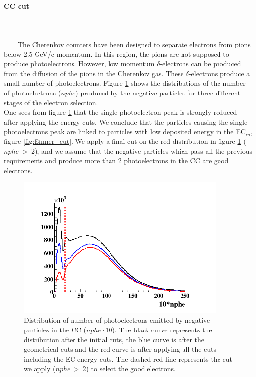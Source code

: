\begin{itemize}
\begin{itemize}
\end{itemize}

\paragraph{CC cut}
~\\
~\\
~~~~The Cherenkov counters have been designed to separate electrons from pions below 2.5 GeV/c momentum. In this region, the pions are not supposed to produce photoelectrons. However, low momentum $\delta$-electrons can be produced from the diffusion of the pions in the Cherenkov gas. These $\delta$-electrons produce a small number of photoelectrons. Figure \ref{fig:Nphe_cut} shows the distributions of the number of photoelectrons ($nphe$) produced by the negative particles for three different stages of the electron selection. \\

   
One sees from figure \ref{fig:Nphe_cut} that the single-photoelectron peak is 
strongly reduced after applying the energy cuts. We conclude that the particles 
causing the single-photoelectrons peak are linked to particles with low 
deposited energy in the EC$_{in}$, figure \ref{fig:Einner_cut}. We apply a 
final cut on the red distribution in figure \ref{fig:Nphe_cut} ($nphe$~>~2), 
and we assume that the negative particles which pass all the previous 
requirements and produce more than 2 photoelectrons in the CC are good 
electrons.
\begin{figure}[tpb]
\centering
\includegraphics[height=7.0cm]{fig_analysis/nphe_all.png}
\caption{Distribution of number of photoelectrons emitted by negative particles 
in the CC ($nphe\cdot$10). The black curve represents the distribution after 
the initial cuts, the blue curve is after the geometrical cuts and the red 
curve is after applying all the cuts including the EC energy cuts. The dashed 
red line represents the cut we apply ($nphe$~>~2) to select the good 
electrons.} \label{fig:Nphe_cut}
\end{figure}


\end{itemize}

